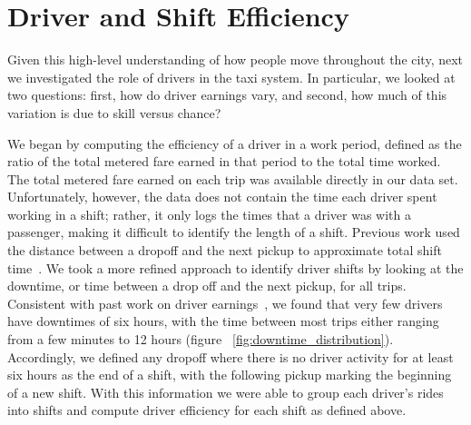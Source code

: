 \documentclass[twocolumn]{article}
\begin{document}
\section{Driver and Shift Efficiency}
Given this high-level understanding of how people move throughout the city, next we investigated the role of drivers in the taxi system. In particular, we looked at two questions: first, how do driver earnings vary, and second, how much of this variation is due to skill versus chance?

We began by computing the efficiency of a driver in a work period, defined as the ratio of the total metered fare earned in that period to the total time worked. The total metered fare earned on each trip was available directly in our data set. Unfortunately, however, the data does not contain the time each driver spent working in a shift; rather, it only logs the times that a driver was with a passenger, making it difficult to identify the length of a shift. Previous work used the distance between a dropoff and the next pickup to approximate total shift time~\cite{LEE:2015}. We took a more refined approach to identify driver shifts by looking at the downtime, or time between a drop off and the next pickup, for all trips.
Consistent with past work on driver earnings~\cite{Farber:2014}, we found that very few drivers have downtimes of six hours, with the time between most trips either ranging from a few minutes to 12 hours (figure ~\ref{fig:downtime_distribution}).
Accordingly, we defined any dropoff where there is no driver activity for at least six hours as the end of a shift, with the following pickup marking the beginning of a new shift.
With this information we were able to group each driver's rides into shifts and compute driver efficiency for each shift as defined above.

\end{document}
